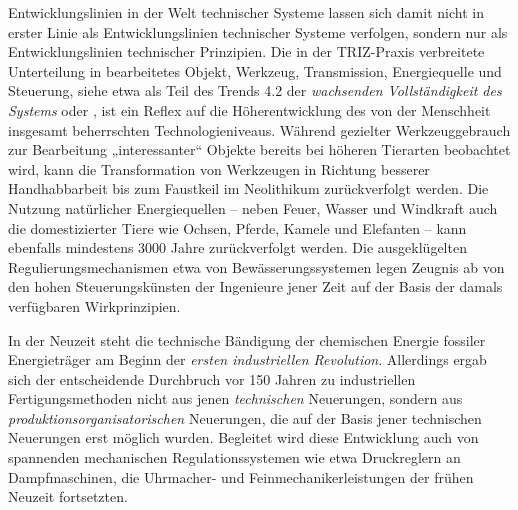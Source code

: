 \documentclass[11pt,a4paper]{article}
\begin{document}
Entwicklungslinien in der Welt technischer Systeme lassen sich damit nicht in
erster Linie als Entwicklungslinien technischer Systeme verfolgen, sondern nur
als Entwicklungslinien technischer Prinzipien. Die in der TRIZ-Praxis
verbreitete Unterteilung in bearbeitetes Objekt, Werkzeug, Transmission,
Energiequelle und Steuerung, siehe etwa \cite{TESE2018} als Teil des Trends
4.2 der \emph{wachsenden Vollständigkeit des Systems} oder \cite{TT}, ist ein
Reflex auf die Höherentwicklung des von der Menschheit insgesamt beherrschten
Technologieniveaus.  Während gezielter Werkzeuggebrauch zur Bearbeitung
„interessanter“ Objekte bereits bei höheren Tierarten beobachtet wird, kann
die Transformation von Werkzeugen in Richtung besserer Handhabbarbeit bis zum
Faustkeil im Neolithikum zurückverfolgt werden.  Die Nutzung natürlicher
Energiequellen -- neben Feuer, Wasser und Windkraft auch die domestizierter
Tiere wie Ochsen, Pferde, Kamele und Elefanten -- kann ebenfalls mindestens
3000 Jahre zurückverfolgt werden. Die ausgeklügelten Regulierungsmechanismen
etwa von Bewässerungssystemen legen Zeugnis ab von den hohen Steuerungskünsten
der Ingenieure jener Zeit auf der Basis der damals verfügbaren Wirkprinzipien.

In der Neuzeit steht die technische Bändigung der chemischen Energie fossiler
Energieträger am Beginn der \emph{ersten industriellen Revolution}. Allerdings
ergab sich der entscheidende Durchbruch vor 150 Jahren zu industriellen
Fertigungsmethoden nicht aus jenen \emph{technischen} Neuerungen, sondern aus
\emph{produktionsorganisatorischen} Neuerungen, die auf der Basis jener
technischen Neuerungen erst möglich wurden. Begleitet wird diese Entwicklung
auch von spannenden mechanischen Regulationssystemen wie etwa Druckreglern an
Dampfmaschinen, die Uhrmacher- und Feinmechanikerleistungen der frühen Neuzeit
fortsetzten.
\end{document}
